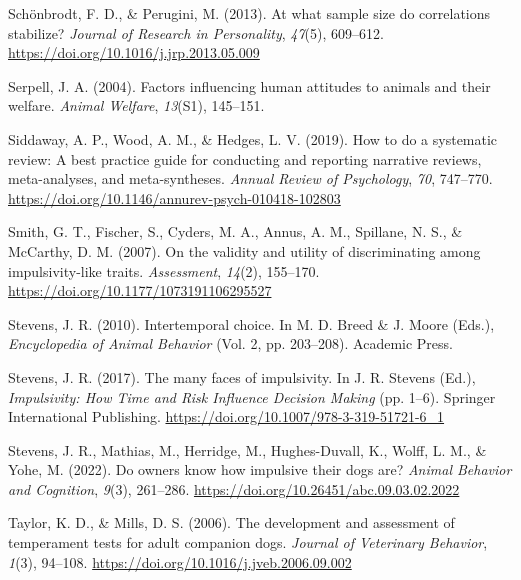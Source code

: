 \documentclass[
  ,pub,floatsintext]{apa6}
\newlength{\cslhangindent}
\newlength{\cslentryspacingunit} %
\newenvironment{CSLReferences}[2] %
 {%
  \setlength{\parindent}{0pt}
  \ifodd #1
  \let\oldpar\par
  \def\par{\hangindent=\cslhangindent\oldpar}
  \fi
  \setlength{\parskip}{#2\cslentryspacingunit}
 }%
 {}
\begin{document}
\begin{CSLReferences}{1}{0}
\leavevmode{}%
Schönbrodt, F. D., \& Perugini, M. (2013). At what sample size do correlations stabilize? \emph{Journal of Research in Personality}, \emph{47}(5), 609--612. \url{https://doi.org/10.1016/j.jrp.2013.05.009}

\leavevmode{}%
Serpell, J. A. (2004). Factors influencing human attitudes to animals and their welfare. \emph{Animal Welfare}, \emph{13}(S1), 145--151.

\leavevmode{}%
Siddaway, A. P., Wood, A. M., \& Hedges, L. V. (2019). How to do a systematic review: {A} best practice guide for conducting and reporting narrative reviews, meta-analyses, and meta-syntheses. \emph{Annual Review of Psychology}, \emph{70}, 747--770. \url{https://doi.org/10.1146/annurev-psych-010418-102803}

\leavevmode{}%
Smith, G. T., Fischer, S., Cyders, M. A., Annus, A. M., Spillane, N. S., \& McCarthy, D. M. (2007). On the validity and utility of discriminating among impulsivity-like traits. \emph{Assessment}, \emph{14}(2), 155--170. \url{https://doi.org/10.1177/1073191106295527}

\leavevmode{}%
Stevens, J. R. (2010). Intertemporal choice. In M. D. Breed \& J. Moore (Eds.), \emph{Encyclopedia of {Animal Behavior}} (Vol. 2, pp. 203--208). {Academic Press}.

\leavevmode{}%
Stevens, J. R. (2017). The many faces of impulsivity. In J. R. Stevens (Ed.), \emph{Impulsivity: {How Time} and {Risk Influence Decision Making}} (pp. 1--6). {Springer International Publishing}. \url{https://doi.org/10.1007/978-3-319-51721-6_1}

\leavevmode{}%
Stevens, J. R., Mathias, M., Herridge, M., Hughes-Duvall, K., Wolff, L. M., \& Yohe, M. (2022). Do owners know how impulsive their dogs are? \emph{Animal Behavior and Cognition}, \emph{9}(3), 261--286. \url{https://doi.org/10.26451/abc.09.03.02.2022}

\leavevmode{}%
Taylor, K. D., \& Mills, D. S. (2006). The development and assessment of temperament tests for adult companion dogs. \emph{Journal of Veterinary Behavior}, \emph{1}(3), 94--108. \url{https://doi.org/10.1016/j.jveb.2006.09.002}


\end{CSLReferences}
\end{document}
